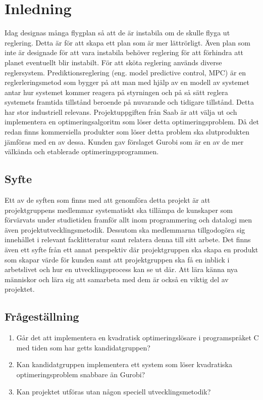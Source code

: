 \section{Inledning}
Idag designas många flygplan så att de är instabila om de skulle flyga ut reglering. Detta är för att skapa ett plan som är mer lättrörligt. Även plan som inte är designade för att vara instabila behöver reglering för att förhindra att planet eventuellt blir instabilt. För att sköta reglering används diverse reglersystem. \citep{airplanestability}
\newline
\newline
Prediktionsreglering (eng. model predictive control, MPC) är en reglerleringsmetod som 
bygger på att man med hjälp av en modell av systemet antar hur systemet kommer reagera på styrningen och på så sätt reglera systemets framtida tillstånd beroende på nuvarande och tidigare tillstånd. Detta har stor industriell relevans.\citep[2]{ir}
\newline
\newline
Projektuppgiften från Saab är att välja ut och implementera en optimeringsalgoritm som löser detta optimeringsproblem. Då det redan finns kommersiella produkter som löser detta problem ska slutprodukten jämföras med en av dessa. Kunden gav förslaget Gurobi som är en av de mer välkända och etablerade optimeringsprogrammen.

\subsection{Syfte}
Ett av de syften som finns med att genomföra detta projekt är att projektgruppens medlemmar systematiskt ska tillämpa de kunskaper som förvärvats under studietiden framför allt inom programmering och datalogi men även projektutvecklingsmetodik. Dessutom ska medlemmarna tillgodogöra sig innehållet i relevant facklitteratur samt relatera denna till sitt arbete. 
Det finns även ett syfte från ett annat perspektiv där projektgruppen ska skapa en produkt som skapar värde för kunden samt att projektgruppen ska få en inblick i arbetslivet och hur en utvecklingsprocess kan se ut där. Att lära känna nya människor och lära sig att samarbeta med dem är också en viktig del av projektet. \citep{tddd77}

\subsection{Frågeställning}
	\begin{enumerate}
		\item Går det att implementera en kvadratisk optimeringslösare i programspråket C med tiden som har getts kandidatgruppen?
		\item Kan kandidatgruppen implementera ett system som löser kvadratiska optimeringsproblem snabbare än Gurobi?
		\item Kan projektet utföras utan någon speciell utvecklingsmetodik? 
	\end{enumerate}

